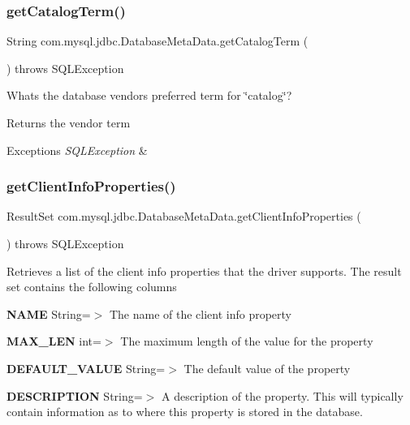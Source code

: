 \subsubsection{\texorpdfstring{get\+Catalog\+Term()}{getCatalogTerm()}}
{\footnotesize\ttfamily String com.\+mysql.\+jdbc.\+Database\+Meta\+Data.\+get\+Catalog\+Term (\begin{DoxyParamCaption}{ }\end{DoxyParamCaption}) throws S\+Q\+L\+Exception}

What\textquotesingle{}s the database vendor\textquotesingle{}s preferred term for \char`\"{}catalog\char`\"{}?

\begin{DoxyReturn}{Returns}
the vendor term 
\end{DoxyReturn}

\begin{DoxyExceptions}{Exceptions}
{\em S\+Q\+L\+Exception} & \\
\hline
\end{DoxyExceptions}
\mbox{\label{classcom_1_1mysql_1_1jdbc_1_1_database_meta_data_ae8da111ec67e4ebf46a2c82127ccaeff}} 
\subsubsection{\texorpdfstring{get\+Client\+Info\+Properties()}{getClientInfoProperties()}}
{\footnotesize\ttfamily Result\+Set com.\+mysql.\+jdbc.\+Database\+Meta\+Data.\+get\+Client\+Info\+Properties (\begin{DoxyParamCaption}{ }\end{DoxyParamCaption}) throws S\+Q\+L\+Exception}

Retrieves a list of the client info properties that the driver supports. The result set contains the following columns 


\begin{DoxyEnumerate}
\item {\bfseries N\+A\+ME} String=$>$ The name of the client info property~\newline
 
\item {\bfseries M\+A\+X\+\_\+\+L\+EN} int=$>$ The maximum length of the value for the property~\newline
 
\item {\bfseries D\+E\+F\+A\+U\+L\+T\+\_\+\+V\+A\+L\+UE} String=$>$ The default value of the property~\newline
 
\item {\bfseries D\+E\+S\+C\+R\+I\+P\+T\+I\+ON} String=$>$ A description of the property. This will typically contain information as to where this property is stored in the database. 
\end{DoxyEnumerate}

